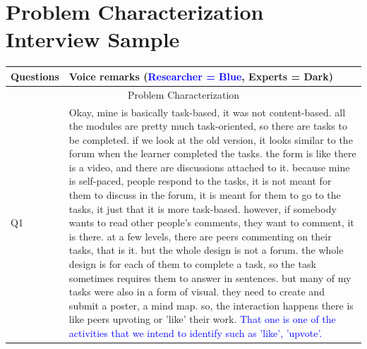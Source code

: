
\chapter{Problem Characterization Interview Sample}

\begin{table}[hbt!]
\centering
\begin{tabular}{|p{3cm}|p{9.5cm}|} %
	\hline
	Questions & Voice remarks (\textcolor{blue}{Researcher = Blue}, Experts = Dark) \\
  	\hline
  	\multicolumn{2}{|c|}{Problem Characterization} \\
  	\hline
	Q1 & Okay, mine is basically task-based, it was not content-based. all the modules are pretty much task-oriented, so there are tasks to be completed. if we look at the old version, it looks similar to the forum when the learner completed the tasks. the form is like there is a video, and there are discussions attached to it. because mine is self-paced, people respond to the tasks, it is not meant for them to discuss in the forum, it is meant for them to go to the tasks, it just that it is more task-based. however, if somebody wants to read other people's comments, they want to comment, it is there. at a few levels, there are peers commenting on their tasks, that is it. but the whole design is not a forum. the whole design is for each of them to complete a task, so the task sometimes requires them to answer in sentences. but many of my tasks were also in a form of visual. they need to create and submit a poster, a mind map. so, the interaction happens there is like peers upvoting or 'like' their work. \newline
	\textcolor{blue}{That one is one of the activities that we intend to identify such as 'like', 'upvote'.} \\
  \hline
\end{tabular}
\end{table}
